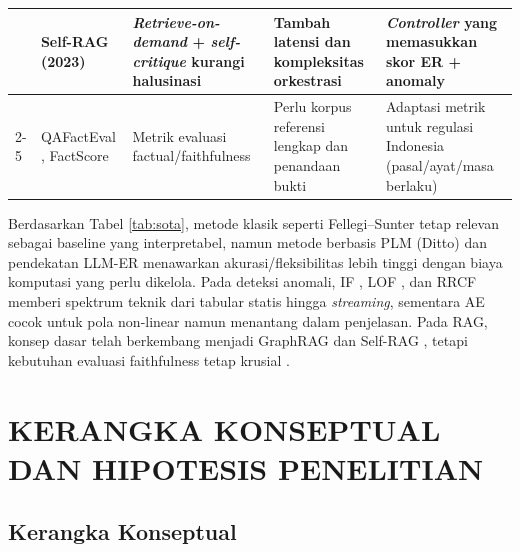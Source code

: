 \documentclass[12pt,a4paper,oneside]{report}
\begin{document}
\begin{landscape}
\begin{longtable}{|p{3.2cm}|p{4.2cm}|p{5.2cm}|p{5.2cm}|p{5.2cm}|}
        & Self-RAG (2023) \cite{sun2023selfrag}
        & \textit{Retrieve-on-demand} + \textit{self-critique} kurangi halusinasi
        & Tambah latensi dan kompleksitas orkestrasi
        & \textit{Controller} yang memasukkan skor ER + anomaly \\ \cline{2-5}

        & QAFactEval \cite{fabbri2021qafacteval}, FactScore \cite{min2023factscore}
        & Metrik evaluasi factual/faithfulness
        & Perlu korpus referensi lengkap dan penandaan bukti
        & Adaptasi metrik untuk regulasi Indonesia (pasal/ayat/masa berlaku) \\
        \end{longtable}

        \normalsize
        \noindent
        Berdasarkan Tabel \ref{tab:sota}, metode klasik seperti Fellegi--Sunter 
        \cite{fellegi1969record} tetap relevan sebagai baseline yang interpretabel, 
        namun metode berbasis PLM (Ditto) \cite{li2020ditto} dan pendekatan LLM-ER 
        \cite{splink2022} menawarkan akurasi/fleksibilitas lebih tinggi dengan biaya 
        komputasi yang perlu dikelola. Pada deteksi anomali, IF \cite{liu2008iforest}, 
        LOF \cite{breunig2000lof}, dan RRCF \cite{guha2016rrcf} memberi spektrum teknik 
        dari tabular statis hingga \textit{streaming}, sementara AE \cite{aggarwal2017outlier} 
        cocok untuk pola non-linear namun menantang dalam penjelasan. Pada RAG, 
        konsep dasar \cite{lewis2020rag} telah berkembang menjadi GraphRAG 
        \cite{microsoft2024graphrag} dan Self-RAG \cite{sun2023selfrag}, tetapi 
        kebutuhan evaluasi faithfulness tetap krusial \cite{fabbri2021qafacteval,min2023factscore}.

    \end{landscape}
    \onehalfspacing
    
    \chapter{KERANGKA KONSEPTUAL DAN HIPOTESIS PENELITIAN}
        \thispagestyle{empty} %
        \section{Kerangka Konseptual}
\end{document}
